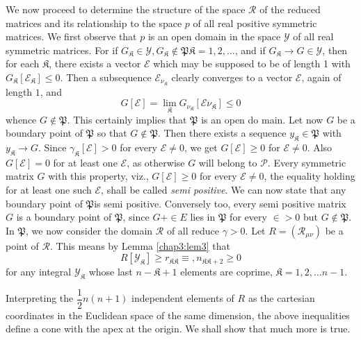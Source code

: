 We now proceed to determine the structure of the space $\mathscr{R}$
of  the  reduced  matrices and its relationship to the space $
p$ of all real positive symmetric matrices. We first observe that $
p$  is an open domain in the  space $ \mathscr{Y} $  of all
real symmetric matrices. For if $ G_\mathfrak{K} \in \mathscr{Y} ,
G_\mathfrak{K} \not\in \mathfrak{P} \mathfrak{K} = 1,2, \ldots $, and if
$G_\mathfrak{K}  \rightarrow G \in \mathscr{Y} $, then for each
$\mathfrak{K} $, there exists a vector $ \mathscr{E}$ which may be
supposed to be of length 1 with  $ G_\mathfrak{K} [
  \mathscr{E}_\mathfrak{K} ] \leq 0 $. Then a subsequence $
\mathscr{E}_{\nu_{\mathfrak{K}}} $ clearly converges to a vector $
\mathscr{E} $, again of length $1$, and  
$$
 G [ \mathscr{E} ] = \lim_\mathfrak{K}  G_{\nu_{\mathfrak{K}}} [ 
   \mathscr{E}{\nu_{\mathfrak{K}}} ] \leq 0  
 $$
 whence $G \not\in \mathfrak{P}$. This certainly implies that
 $\mathfrak{P}$ is an open do main. Let now $G$ be a boundary point of
 $ \mathfrak{P} $ so that $ G \not \in \mathfrak{P} $. Then there
 exists a sequence $ y_\mathfrak{K} \in \mathfrak{P} $ with $
 y_\mathfrak{K} \rightarrow G $. Since $ \gamma_\mathfrak{K} [
   \mathscr{E} ]> 0 $ for every $ \mathscr{E} \neq 0 $, we get $ G [
   \mathscr{E} ] \ge 0 $ for  $ \mathscr{E} \neq 0 $. Also $ G [
   \mathscr{E} ] = 0 $ for at least one $ \mathscr{E} $, as otherwise
 $G$ will belong to $\mathcal{P} $. Every symmetric matrix $G$ with
 this property, viz., $ G [\mathscr{E} ] \ge 0 $ for every $
 \mathscr{E} \neq 0 $, the equality  holding for at least one such
 $\mathscr{E}$, shall be called \textit{semi positive}. We can now
 state that any boundary point of $ \mathfrak{P} $\pageoriginale is
 semi 
 positive. Conversely too, every semi positive matrix $G$ is a
 boundary point of $ \mathfrak{P} $, since $ G + \in E $ lies in  $
 \mathfrak{P} $ for every $ \in > 0 $ but $ G \not\in \mathfrak{P}
 $. In $\mathfrak{P}$, we now consider the domain  $\mathscr{R}$
 of all reduce $\gamma > 0$. Let $ R = (\mathscr{R}_{\mu \nu }) $
 be a point of $\mathscr{R}$. This means by Lemma \ref{chap3:lem3} that 
 \begin{equation*}
R [ \mathscr{Y}_\mathfrak{K} ] \ge r_{\mathfrak{K} \mathfrak{K} } \equiv,
n_{\mathfrak{K} \mathfrak{K} + 2} \ge 0 \tag*{$(46)'$}\label{eq46'}   
 \end{equation*} 
for any integral $\mathscr{Y}_\mathfrak{K}$ whose last $ n-
\mathfrak{K} + 1$ elements are coprime, $ \mathfrak{K} = 1,2, \ldots
n-1 $. 

Interpreting the $ \dfrac{1}{2} n ( n + 1 ) $ independent elements of
$R$ as the cartesian coordinates in the Euclidean space of the same
dimension, the  above inequalities define a cone with the apex at the
origin. We shall show that much more is true.  


